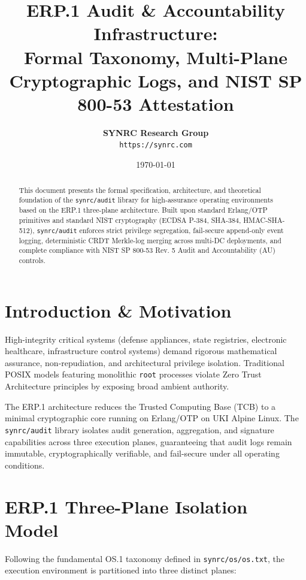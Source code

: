 \documentclass{article}
\title{\textbf{ERP.1 Audit \& Accountability Infrastructure:}\\Formal Taxonomy, Multi-Plane Cryptographic Logs, and NIST SP 800-53 Attestation}
\author{\textbf{SYNRC Research Group} \\ \texttt{https://synrc.com}}
\date{\today}
\begin{document}
\maketitle

\begin{abstract}
This document presents the formal specification, architecture, and theoretical foundation of the \texttt{synrc/audit} library for high-assurance operating environments based on the ERP.1 three-plane architecture. Built upon standard Erlang/OTP primitives and standard NIST cryptography (ECDSA P-384, SHA-384, HMAC-SHA-512), \texttt{synrc/audit} enforces strict privilege segregation, fail-secure append-only event logging, deterministic CRDT Merkle-log merging across multi-DC deployments, and complete compliance with NIST SP 800-53 Rev. 5 Audit and Accountability (AU) controls.
\end{abstract}

\tableofcontents
\newpage

\section{Introduction \& Motivation}
High-integrity critical systems (defense appliances, state registries, electronic healthcare, infrastructure control systems) demand rigorous mathematical assurance, non-repudiation, and architectural privilege isolation. Traditional POSIX models featuring monolithic \texttt{root} processes violate Zero Trust Architecture principles by exposing broad ambient authority.

The ERP.1 architecture reduces the Trusted Computing Base (TCB) to a minimal cryptographic core running on Erlang/OTP on UKI Alpine Linux. The \texttt{synrc/audit} library isolates audit generation, aggregation, and signature capabilities across three execution planes, guaranteeing that audit logs remain immutable, cryptographically verifiable, and fail-secure under all operating conditions.

\section{ERP.1 Three-Plane Isolation Model}
Following the fundamental OS.1 taxonomy defined in \texttt{synrc/os/os.txt}, the execution environment is partitioned into three distinct planes:
\end{document}
